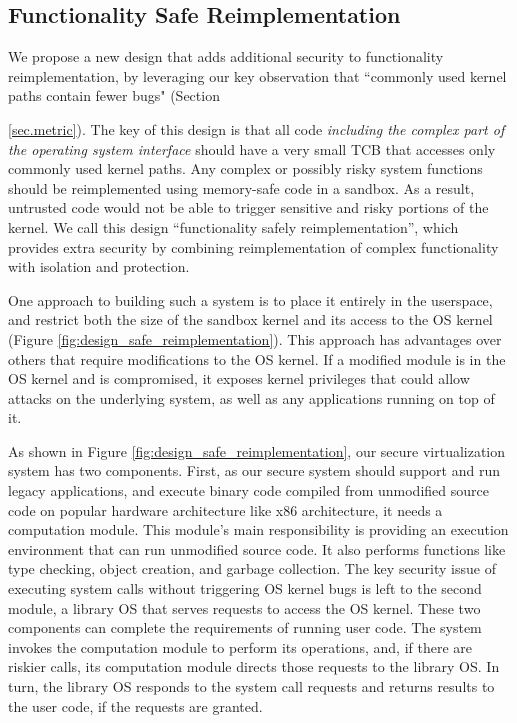 
\subsection{Functionality Safe Reimplementation}
We propose a new design that adds additional security to
functionality reimplementation, by leveraging our key observation
 that ``commonly used kernel paths contain fewer bugs"
(Section {\ref{sec.metric}).
The key of this design is that all code \emph{including the complex part
of the operating system interface} should have a very small TCB that accesses only
commonly used kernel paths. Any complex or possibly risky system functions
should be reimplemented using memory-safe code in a sandbox.
As a result, untrusted code would not be able to
trigger sensitive and risky portions of the kernel.
We call this design ``functionality safely reimplementation'',
which provides extra security by combining reimplementation of
complex functionality with isolation and protection.

One approach to building such a system is to place it entirely in the userspace,
and restrict both the size of the sandbox kernel and its access to the
OS kernel (Figure \ref{fig:design_safe_reimplementation}).
This approach has advantages over others that require modifications to
the OS kernel.
If a modified module is in the OS kernel and is compromised, it exposes
kernel privileges that could allow attacks
on the underlying system, as well as any applications running on top of it.

As shown in Figure \ref{fig:design_safe_reimplementation}, our secure virtualization system
has two components. First, as our secure system should support and run legacy applications,
and execute binary code compiled from unmodified source code on popular hardware architecture
like x86 architecture, it needs a computation module. 
This module's main responsibility is providing an execution environment 
that can run unmodified source code. It also performs functions like type checking,
object creation, and garbage collection. 
The key security issue of executing system calls
without triggering OS kernel bugs is left to the second module, a library OS
that serves requests to access the OS kernel.
These two components can complete the requirements of running user code.
The system invokes the computation module to perform its operations,
and, if there are riskier calls, its computation module directs those requests to the
library OS. In turn, the library OS responds to the system call requests and
returns results to the user code, if the requests are granted. 

}
